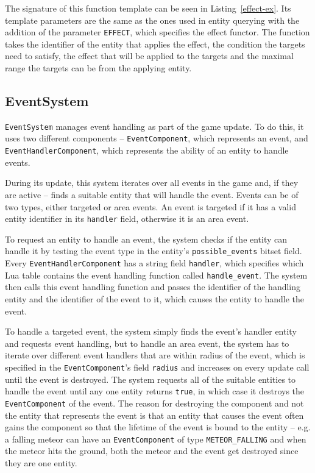The signature of this function template can be seen in Listing~\ref{effect-ex}. Its template parameters are the same as the ones used
in entity querying with the addition of the parameter \texttt{EFFECT}, which specifies the effect functor. The function takes the
identifier of the entity that applies the effect, the condition the targets need to satisfy, the effect that will be applied to the
targets and the maximal range the targets can be from the applying entity.

\subsection{EventSystem}

\texttt{EventSystem} manages event handling as part of the game update. To do this, it uses two different components --
\texttt{EventComponent}, which represents an event, and \texttt{EventHandlerComponent}, which represents the ability of an entity
to handle events.

During its update, this system iterates over all events in the game and, if they are active -- finds a suitable entity that will
handle the event. Events can be of two types, either targeted or area events. An event is targeted if it has a valid entity
identifier in its \texttt{handler} field, otherwise it is an area event.

To request an entity to handle an event, the system checks if the entity can handle it by testing the event type in the entity's
\texttt{possible\_events} bitset field. Every \texttt{EventHandlerComponent} has a string field \texttt{handler}, which specifies
which Lua table contains the event handling function called \texttt{handle\_event}. The system then calls this event handling
function and passes the identifier of the handling entity and the identifier of the event to it, which causes the entity
to handle the event.

To handle a targeted event, the system simply finds the event's handler entity and requests event handling, but to handle an area event,
the system has to iterate over different event handlers that are within radius of the event, which is specified in the
\texttt{EventComponent}'s field \texttt{radius} and increases on every update call until the event is destroyed. The system requests
all of the suitable entities to handle the event until any one entity returns \texttt{true}, in which case it destroys the
\texttt{EventComponent} of the event. The reason for destroying the component and not the entity that represents the event is that
an entity that causes the event often gains the component so that the lifetime of the event is bound to the entity -- e.g. a falling
meteor can have an \texttt{EventComponent} of type \texttt{METEOR\_FALLING} and when the meteor hits the ground, both the meteor and
the event get destroyed since they are one entity.

